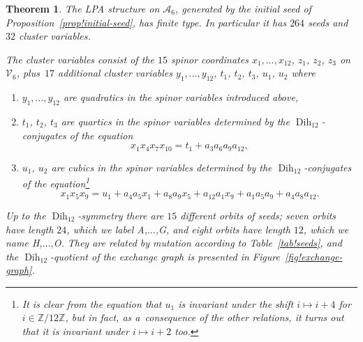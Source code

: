 \documentclass[10pt,a4paper]{amsart}
\numberwithin{equation}{section}
\newtheorem{thm}{Theorem}[section]
\theoremstyle{definition}
\newcommand{\ZZ}{\mathbb{Z}}
\DeclareMathOperator{\Dih}{Dih}
\begin{document}
\begin{thm}\label{thm!main-result}
The LPA structure on $\mathcal A_6$, generated by the initial seed of Proposition~{\rm\ref{prop!initial-seed}}, has finite type. In particular it has $264$ seeds and $32$ cluster variables.

The cluster variables consist of the $15$ spinor coordinates $x_1,\ldots,x_{12}$, $z_1$, $z_2$, $z_3$ on $\mathcal V_6$, plus~$17$ additional cluster variables $y_1,\ldots,y_{12}$, $t_1$, $t_2$, $t_3$, $u_1$, $u_2$ where
\begin{enumerate}\itemsep=0pt
\item[$(1)$] $y_1,\ldots,y_{12}$ are quadratics in the spinor variables introduced above,
\item[$(2)$] $t_1$, $t_2$, $t_3$ are quartics in the spinor variables determined by the $\Dih_{12}$-conjugates of the equation
\[ x_1x_4x_7x_{10} = t_1 + a_3a_6a_9a_{12}, \]
\item[$(3)$] $u_1$, $u_2$ are cubics in the spinor variables determined by the $\Dih_{12}$-conjugates of the equation\footnote{It is clear from the equation that $u_1$ is invariant under the shift $i\mapsto i+4$ for $i\in \ZZ/12\ZZ$, but in fact, as a~consequence of the other relations, it turns out that it is invariant under $i\mapsto i+2$ too.}
\[ x_1x_5x_9 = u_1 + a_4a_5x_1 + a_8a_9x_5 + a_{12}a_1x_9 + a_1a_5a_9 + a_4a_8a_{12}. \]
\end{enumerate}
Up to the $\Dih_{12}$-symmetry there are $15$ different orbits of seeds; seven orbits have length $24$, which we label A,$\ldots$,G, and eight orbits have length $12$, which we name H,$\ldots$,O. They are related by mutation according to Table~{\rm\ref{tab!seeds}}, and the $\Dih_{12}$-quotient of the exchange graph is presented in Figure~{\rm\ref{fig!exchange-graph}}.
\end{thm}
\end{document}
